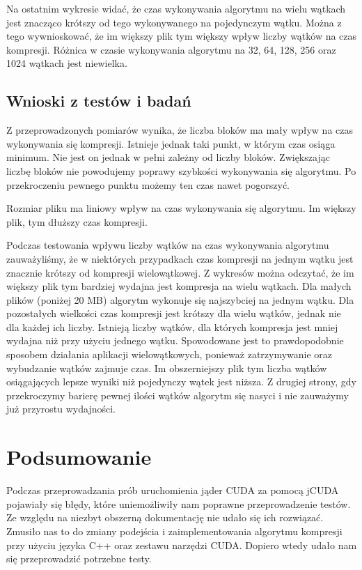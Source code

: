 \documentclass[12pt,a4paper,titlepage]{article}
\begin{document}
Na ostatnim wykresie widać, że czas wykonywania algorytmu na wielu wątkach jest znacząco krótszy od tego wykonywanego na pojedynczym wątku. Można z tego wywnioskować, że im większy plik tym większy wpływ liczby wątków na czas kompresji. Różnica w czasie wykonywania algorytmu na 32, 64, 128, 256 oraz 1024 wątkach jest niewielka.

\subsection{Wnioski z testów i badań}
Z przeprowadzonych pomiarów wynika, że liczba bloków ma mały wpływ na czas wykonywania się kompresji. Istnieje jednak taki punkt, w którym czas osiąga minimum. Nie jest on jednak w pełni zależny od liczby bloków. Zwiększając liczbę bloków nie powodujemy poprawy szybkości wykonywania się algorytmu. Po przekroczeniu pewnego punktu możemy ten czas nawet pogorszyć.

Rozmiar pliku ma liniowy wpływ na czas wykonywania się algorytmu. Im większy plik, tym dłuższy czas kompresji.

Podczas testowania wpływu liczby wątków na czas wykonywania algorytmu zauważyliśmy, że w niektórych przypadkach czas kompresji na jednym wątku jest znacznie krótszy od kompresji wielowątkowej. Z wykresów można odczytać, że im większy plik tym bardziej wydajna jest kompresja na wielu wątkach. Dla małych plików (poniżej 20 MB) algorytm wykonuje się najszybciej na jednym wątku. Dla pozostałych wielkości czas kompresji jest krótszy dla wielu wątków, jednak nie dla każdej ich liczby. Istnieją liczby wątków, dla których kompresja jest mniej wydajna niż przy użyciu jednego wątku. Spowodowane jest to prawdopodobnie sposobem działania aplikacji wielowątkowych, ponieważ zatrzymywanie oraz wybudzanie wątków zajmuje czas. Im obszerniejszy plik tym liczba wątków osiągających lepsze wyniki niż pojedynczy wątek jest niższa. Z drugiej strony, gdy przekroczymy barierę pewnej ilości wątków algorytm się nasyci i nie zauważymy już przyrostu wydajności.

\newpage
\section{Podsumowanie}
Podczas przeprowadzania prób uruchomienia jąder CUDA za pomocą jCUDA pojawiały się błędy, które uniemożliwiły nam poprawne przeprowadzenie testów. Ze względu na niezbyt obszerną dokumentację nie udało się ich rozwiązać. Zmusiło nas to do zmiany podejścia i zaimplementowania algorytmu kompresji przy użyciu języka C++ oraz zestawu narzędzi CUDA. Dopiero wtedy udało nam się przeprowadzić potrzebne testy.

\newpage


\end{document}
